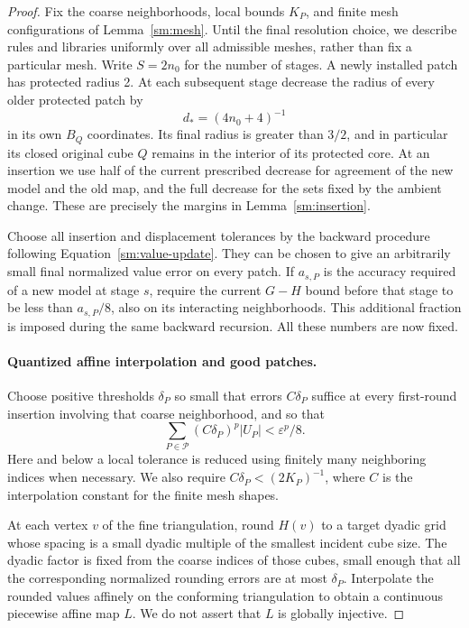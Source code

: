 \documentclass[11pt]{article}
\numberwithin{equation}{section}
\theoremstyle{definition}
\theoremstyle{remark}
\newcommand{\eps}{\varepsilon}
\begin{document}
\begin{proof}
Fix the coarse neighborhoods, local bounds $K_P$, and finite
mesh configurations of Lemma~\ref{sm:mesh}.  Until the final resolution
choice, we describe rules and libraries uniformly over all admissible
meshes, rather than fix a particular mesh.  Write
$S=2n_0$ for the number of stages.  A newly installed patch
has protected radius 2.  At each subsequent stage decrease
the radius of every older protected patch by
\begin{equation}
 \label{sm:shrink-size}
 d_*=(4n_0+4)^{-1}
\end{equation}
in its own $B_Q$ coordinates.  Its final radius is greater
than $3/2$, and in particular its closed original cube $Q$
remains in the interior of its protected core.  At an
insertion we use half of the current prescribed decrease
for agreement of the new model and the old map, and the
full decrease for the sets fixed by the ambient change.
These are precisely the margins in
Lemma~\ref{sm:insertion}.

Choose all insertion and displacement tolerances by the
backward procedure following Equation~\eqref{sm:value-update}.
They can be chosen to give an arbitrarily small final
normalized value error on every patch.  If $a_{s,P}$ is
the accuracy required of a new model at stage $s$, require
the current $G-H$ bound before that stage to be less than
$a_{s,P}/8$, also on its interacting neighborhoods.  This
additional fraction is imposed during the same backward
recursion.  All these numbers are now fixed.

\paragraph{Quantized affine interpolation and good patches.}
Choose positive thresholds $\delta_P$ so small that errors
$C\delta_P$ suffice at every first-round insertion involving
that coarse neighborhood, and so that
\begin{equation}
 \label{sm:good-error-budget}
 \sum_{P\in\mathcal P}(C\delta_P)^p |U_P|<\eps^p/8.
\end{equation}
Here and below a local tolerance is reduced using finitely many
neighboring indices when necessary.  We also require
$C\delta_P<(2K_P)^{-1}$, where $C$ is the interpolation
constant for the finite mesh shapes.

At each vertex $v$ of the fine triangulation, round $H(v)$
to a target dyadic grid whose spacing is a small dyadic
multiple of the smallest incident cube size.  The dyadic
factor is fixed from the coarse indices of those cubes,
small enough that all the corresponding normalized
rounding errors are at most $\delta_P$.  Interpolate
the rounded values affinely on the conforming
triangulation to obtain a continuous piecewise affine
map $L$.  We do not assert that $L$ is globally injective.


\end{proof}
\end{document}
